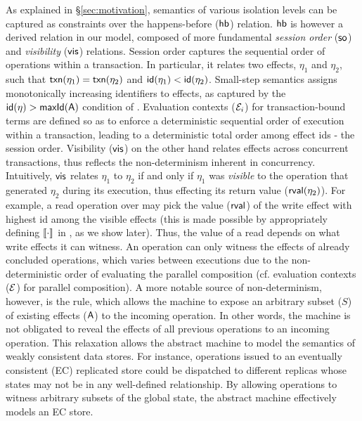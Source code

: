 As explained in \S\ref{sec:motivation}, semantics of various isolation
levels can be captured as constraints over the happens-before ($\textsf{hb}$)
relation. $\textsf{hb}$ is however a derived relation in our model, composed
of more fundamental \emph{session order} ($\textsf{so}$) and
\emph{visibility} ($\textsf{vis}$) relations. Session order captures the
sequential order of operations within a transaction. In particular, it
relates two effects, $\eta_1$ and $\eta_2$, such that $\textsf{txn}(\eta_1) =
\textsf{txn}(\eta_2)$ and $\textsf{id}(\eta_1) < \textsf{id}(\eta_2)$. Small-step semantics
assigns monotonically increasing identifiers to effects, as captured
by the $\textsf{id}(\eta) > \textsf{maxId}(\textsf{A})$ condition of .
Evaluation contexts ($\mathcal{E}_i$) for transaction-bound terms are
defined so as to enforce a deterministic sequential order of execution
within a transaction, leading to a deterministic total order among
effect ids - the session order. Visibility ($\textsf{vis}$) on the other
hand relates effects across concurrent transactions, thus reflects the
non-determinism inherent in concurrency. Intuitively, $\textsf{vis}$ relates
$\eta_1$ to $\eta_2$ if and only if $\eta_1$ was \emph{visible} to the
operation that generated $\eta_2$ during its execution, thus 
effecting its return value ($\textsf{rval}(\eta_2)$). For example, a read
operation over  may pick the value ($\textsf{rval}$) of the write effect
with highest id among the visible effects (this is made possible by
appropriately defining $\llbracket \cdot \rrbracket$ in ,
as we show later). Thus, the value of a read depends on what write
effects it can witness. An operation can only witness the effects of
already concluded operations, which varies between executions due to
the non-deterministic order of evaluating the parallel composition
(cf. evaluation contexts ($\mathcal{E}$) for parallel composition). A more
notable source of non-determinism, however, is the 
rule, which allows the machine to expose an arbitrary subset ($S$) of
existing effects ($\textsf{A}$) to the incoming operation. In other words, the
machine is not obligated to reveal the effects of all previous
operations to an incoming operation. This relaxation allows the
abstract machine to model the semantics of weakly consistent data
stores. For instance, operations issued to an eventually consistent
(EC) replicated store could be dispatched to different replicas whose
states may not be in any well-defined relationship. By allowing
operations to witness arbitrary subsets of the global state, the
abstract machine effectively models an EC store.

